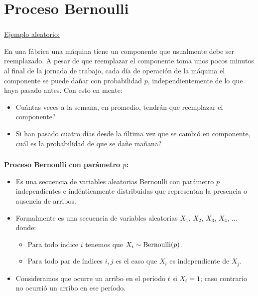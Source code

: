 \documentclass[ 10pt, xcolor = dvipsnames]{beamer}
\begin{document}
\section{Proceso Bernoulli}

\begin{frame}[allowframebreaks]
\frametitle{\insertsection}

\underline{Ejemplo aleatorio:}

En una f\'abrica una m\'aquina tiene un componente que usualmente debe ser reemplazado. A pesar de que reemplazar el componente toma unos pocos minutos al final de la jornada de trabajo, cada d\'ia de operaci\'on de la m\'aquina el componente se puede da\~nar con probabilidad $p$, independientemente de lo que haya pasado antes. Con esto en mente: 
\begin{itemize}
\item Cu\'antas veces a la semana, en promedio, tendr\'an que reemplazar el componente? 
\item Si han pasado cuatro d\'ias desde la \'ultima vez que se cambi\'o en componente, cu\'al es la probabilidad de que se da\~ne ma\~nana? 
\end{itemize}

\end{frame}

\begin{frame}[allowframebreaks]
\frametitle{\insertsection}

\textbf{Proceso Bernoulli con par\'ametro $p$:}
\begin{itemize}
\item Es una secuencia de variables aleatorias Bernoulli con par\'ametro $p$ independientes e ind\'enticamente distribuidas que representan la \linebreak presencia o ausencia de arribos. 
\item Formalmente es una secuencia de variables aleatorias $X_1, \, X_2, \, X_3, \, X_4, \, \dots$ donde: 
\begin{itemize}
\item Para todo \'indice $i$ tenemos que $X_i \sim \text{Bernoulli}(p)$. 
\item Para todo par de \'indices $i,j$ es el caso que $X_i$ es independiente de $X_j$. 
\end{itemize}
\item Consideramos que ocurre un arribo en el per\'iodo $t$ si $X_t = 1$; caso contrario no ocurri\'o un arribo en ese per\'iodo. 
\end{itemize}

\end{frame}
\end{document}
